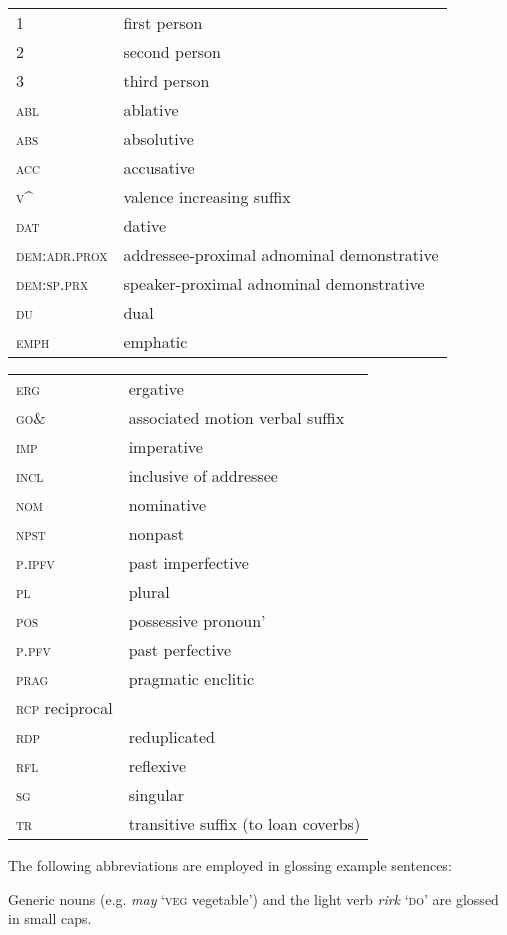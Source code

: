 \documentclass[output=paper]{langscibook}
\begin{document}
\begin{tabularx}{.45\textwidth}{lQ}
1 & first person\\ 
2 & second person\\ 
3 & third person\\ 
\textsc{abl} & ablative\\ 
\textsc{abs} & absolutive\\ 
\textsc{acc} & accusative\\ 
\textsc{v\^{}}& valence increasing suffix \\ \textsc{dat} & dative\\ 
\textsc{dem:adr.prox} & addressee-proximal adnominal demonstrative\\ 
\textsc{dem:sp.prx} & speaker-proximal adnominal demonstrative\\
\textsc{du} & dual\\ 
\textsc{emph} & emphatic\\ 
\end{tabularx}
\begin{tabularx}{.45\textwidth}{lQ}
\textsc{erg} & ergative\\ 
\textsc{go\&}  & associated motion verbal suffix\\
\textsc{imp} & imperative\\ 
\textsc{incl} & inclusive of addressee\\
\textsc{nom} & nominative\\ 
\textsc{npst} & nonpast\\ 
\textsc{p.ipfv} & past imperfective\\ 
\textsc{pl} & plural\\ 
\textsc{pos} & possessive pronoun’ \\
\textsc{p.pfv} & past perfective\\ 
\textsc{prag} & pragmatic enclitic\\ 
\textsc{rcp} reciprocal\\
\textsc{rdp} & reduplicated\\ 
\textsc{rfl} & reflexive\\ 
\textsc{sg} & singular\\
\textsc{tr} & transitive suffix (to loan coverbs)\\
\end{tabularx}

The following abbreviations are employed in glossing example sentences: 
 

Generic nouns (e.g. \textit{may} ‘\textsc{veg} vegetable’) and the light verb \textit{rirk} ‘\textsc{do}’ are glossed in small caps.
\end{document}
